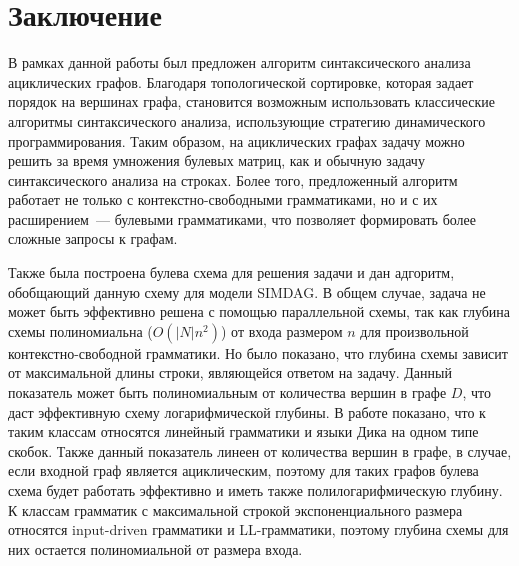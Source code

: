 \section*{Заключение}
В рамках данной работы был предложен алгоритм синтаксического анализа ациклических графов. Благодаря топологической сортировке, которая задает порядок на вершинах графа, становится возможным использовать классические алгоритмы синтаксического анализа, использующие стратегию динамического программирования. Таким образом, на ациклических графах задачу можно решить за время умножения булевых матриц, как и обычную задачу синтаксического анализа на строках. Более того, предложенный алгоритм работает не только с контекстно-свободными грамматиками, но и с их расширением~--- булевыми грамматиками, что позволяет формировать более сложные запросы к графам.

Также была построена булева схема для решения задачи и дан адгоритм, обобщающий данную схему для модели SIMDAG. В общем случае, задача не может быть эффективно решена с помощью параллельной схемы, так как глубина схемы полиномиальна ($O(|N|n^2)$) от входа размером $n$ для произвольной контекстно-свободной грамматики. Но было показано, что глубина схемы зависит от максимальной длины строки, являющейся ответом на задачу. Данный показатель может быть полиномиальным от количества вершин в графе $D$, что даст эффективную схему логарифмической глубины. В работе показано, что к таким классам относятся линейный грамматики и языки Дика на одном типе скобок. Также данный показатель линеен от количества вершин в графе, в случае, если входной граф является ациклическим, поэтому для таких графов булева схема будет работать эффективно и иметь также полилогарифмическую глубину. К классам грамматик с максимальной строкой экспоненциального размера относятся input-driven грамматики и LL-грамматики, поэтому глубина схемы для них остается полиномиальной от размера входа.



